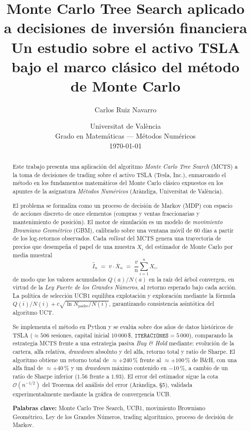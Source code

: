 \documentclass[12pt, a4paper]{article}
\title{
    \vspace{-1.5cm}
    \textbf{Monte Carlo Tree Search aplicado a decisiones de inversión financiera}\\[0.3cm]
    \large Un estudio sobre el activo TSLA bajo el marco clásico del método de Monte Carlo
}
\author{Carlos Ruiz Navarro}
\date{Universitat de València \\ Grado en Matemáticas --- Métodos Numéricos \\[0.2cm] \today}
\theoremstyle{definition}
\theoremstyle{remark}
\begin{document}
\maketitle

\begin{abstract}
\noindent
Este trabajo presenta una aplicación del algoritmo \emph{Monte Carlo Tree Search} (MCTS) a la toma de decisiones de trading sobre el activo TSLA (Tesla, Inc.), enmarcando el método en los fundamentos matemáticos del Monte Carlo clásico expuestos en los apuntes de la asignatura \emph{Métodos Numéricos} (Aràndiga, Universitat de València).

El problema se formaliza como un proceso de decisión de Markov (MDP) con espacio de acciones discreto de once elementos (compras y ventas fraccionarias y mantenimiento de posición). El motor de simulación es un modelo de \emph{movimiento Browniano Geométrico} (GBM), calibrado sobre una ventana móvil de $60$ días a partir de los log-retornos observados. Cada \emph{rollout} del MCTS genera una trayectoria de precios que desempeña el papel de una muestra $X_i$ del estimador de Monte Carlo por media muestral
\[
    \widehat{I}_n \;=\; v \cdot \overline{X}_n \;=\; \frac{v}{n}\sum_{i=1}^{n} X_i,
\]
de modo que los valores acumulados $Q(a)/N(a)$ en la raíz del árbol convergen, en virtud de la \emph{Ley Fuerte de los Grandes Números}, al retorno esperado bajo cada acción. La política de selección UCB1 equilibra explotación y exploración mediante la fórmula $Q(i)/N(i) + c\sqrt{\ln N_{\text{padre}}/N(i)}$, garantizando consistencia asintótica del algoritmo UCT.

Se implementa el método en Python y se evalúa sobre dos años de datos históricos de TSLA ($\approx 506$ sesiones, capital inicial $10\,000$\,\$, $\texttt{ITERACIONES}=5\,000$), comparando la estrategia MCTS frente a una estrategia pasiva \emph{Buy \& Hold} mediante: evolución de la cartera, alfa relativa, \emph{drawdown} absoluto y del alfa, retorno total y ratio de Sharpe. El algoritmo obtiene un retorno total de $\approx +240\,\%$ frente al $\approx +100\,\%$ de B\&H, con una alfa final de $\approx +40\,\%$ y un \emph{drawdown} máximo contenido en $-10\,\%$, a cambio de un ratio de Sharpe inferior ($1{.}56$ frente a $1{.}93$). El error del estimador sigue la cota $\mathcal{O}(n^{-1/2})$ del Teorema del análisis del error (Aràndiga, §5), validada experimentalmente mediante la gráfica de convergencia UCB.

\vspace{0.3cm}
\noindent\textbf{Palabras clave:} Monte Carlo Tree Search, UCB1, movimiento Browniano Geométrico, Ley de los Grandes Números, trading algorítmico, proceso de decisión de Markov.
\end{abstract}
\end{document}
